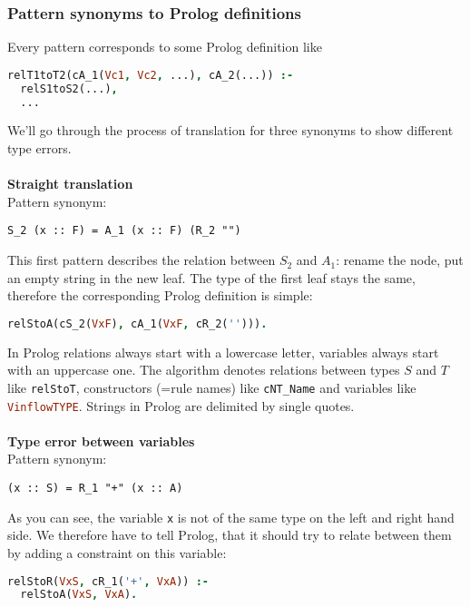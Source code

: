 \documentclass[a4paper]{article}
\begin{document}
\subsubsection*{Pattern synonyms to Prolog definitions}
Every pattern corresponds to some Prolog definition like
\begin{lstlisting}[language=Prolog]
relT1toT2(cA_1(Vc1, Vc2, ...), cA_2(...)) :- 
  relS1toS2(...),
  ...
\end{lstlisting}
We'll go through the process of translation for three synonyms to show different type errors.\\\\
{\bfseries Straight translation}\\
Pattern synonym:
\begin{lstlisting}[language=transformer]
S_2 (x :: F) = A_1 (x :: F) (R_2 "")
\end{lstlisting}
This first pattern describes the relation between $S_2$ and $A_1$: rename the node, put an empty string in the new leaf. The type of the first leaf stays the same, therefore the corresponding Prolog definition is simple:
\begin{lstlisting}[language=Prolog]
relStoA(cS_2(VxF), cA_1(VxF, cR_2(''))).
\end{lstlisting}
In Prolog relations always start with a lowercase letter, variables always start with an uppercase one. The algorithm denotes relations between types $S$ and $T$ like \lstinline[language=Prolog]{relStoT}, constructors (=rule names) like \lstinline[language=Prolog]{cNT_Name} and variables like \lstinline[language=Prolog]{VinflowTYPE}. Strings in Prolog are delimited by single quotes.\\\\

{\bfseries Type error between variables}\\
Pattern synonym:
\begin{lstlisting}[language=transformer]
 (x :: S) = R_1 "+" (x :: A)
\end{lstlisting}
As you can see, the variable \verb|x| is not of the same type on the left and right hand side. We therefore have to tell Prolog, that it should try to relate between them by adding a constraint on this variable:
\begin{lstlisting}[language=Prolog]
relStoR(VxS, cR_1('+', VxA)) :-
  relStoA(VxS, VxA).
\end{lstlisting}
\end{document}
